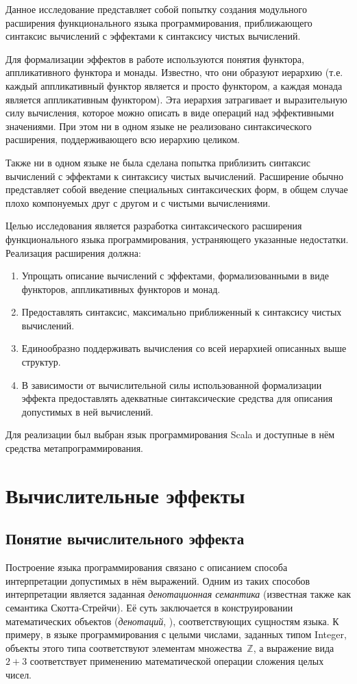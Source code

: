 Данное исследование представляет собой попытку создания модульного расширения функционального языка программирования, приближающего синтаксис вычислений с эффектами к синтаксису чистых вычислений.

Для формализации эффектов в работе используются понятия функтора, аппликативного функтора и монады. Известно, что они образуют иерархию (т.е. каждый аппликативный функтор является и просто функтором, а каждая монада является аппликативным функтором). Эта иерархия затрагивает и выразительную силу вычисления, которое можно описать в виде операций над эффективными значениями. При этом ни в одном языке не реализовано синтаксического расширения, поддерживающего всю иерархию целиком.

Также ни в одном языке не была сделана попытка приблизить синтаксис вычислений с эффектами к синтаксису чистых вычислений. Расширение обычно представляет собой введение специальных синтаксических форм, в общем случае плохо компонуемых друг с другом и с чистыми вычислениями.

Целью исследования является разработка синтаксического расширения функционального языка программирования, устраняющего указанные недостатки. Реализация расширения должна:
\begin{enumerate}
  \item Упрощать описание вычислений с эффектами, формализованными в виде функторов, аппликативных функторов и монад.
  \item Предоставлять синтаксис, максимально приближенный к синтаксису чистых вычислений.
  \item Единообразно поддерживать вычисления со всей иерархией описанных выше структур.
  \item В зависимости от вычислительной силы использованной формализации эффекта предоставлять адекватные синтаксические средства для описания допустимых в ней вычислений.
\end{enumerate}

Для реализации был выбран язык программирования Scala и доступные в нём средства метапрограммирования. 

\chapter{Вычислительные эффекты}
\section{Понятие вычислительного эффекта}
Построение языка программирования связано с описанием способа интерпретации допустимых в нём выражений. Одним из таких способов интерпретации является заданная \emph{денотационная семантика} (известная также как семантика Скотта-Стрейчи\cite{stoy1977denotational}). Её суть заключается в конструировании математических объектов (\emph{денотаций}, ), соответствующих сущностям языка.  К примеру, в языке программирования с целыми числами, заданных типом \<Integer\>, объекты этого типа соответствуют элементам множества~$\mathbb{Z}$, а выражение вида $2 + 3$ соответствует применению математической операции сложения целых чисел.

